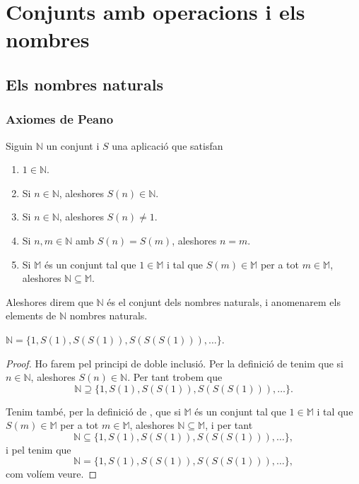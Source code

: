 \documentclass[../Apunts.tex]{subfiles}
\begin{document}
	\chapter{Conjunts amb operacions i els nombres}
	\section{Els nombres naturals}
	\subsection{Axiomes de Peano}
	\begin{definition}
		\label{def:nombres naturals}
		Siguin \(\mathbb{N}\) un conjunt i \(S\) una aplicació que satisfan
		\begin{enumerate}
			\item \(1\in\mathbb{N}\).
			\item Si \(n\in\mathbb{N}\), aleshores \(S(n)\in\mathbb{N}\).
			\item Si \(n\in\mathbb{N}\), aleshores \(S(n)\neq1\).
			\item Si \(n,m\in\mathbb{N}\) amb \(S(n)=S(m)\), aleshores \(n=m\).
			\item Si \(\mathbb{M}\) és un conjunt tal que \(1\in\mathbb{M}\) i tal que \(S(m)\in\mathbb{M}\) per a tot \(m\in\mathbb{M}\), aleshores \(\mathbb{N}\subseteq\mathbb{M}\).
		\end{enumerate}
		Aleshores direm que \(\mathbb{N}\) és el conjunt dels nombres naturals, i anomenarem els elements de \(\mathbb{N}\) nombres naturals.
	\end{definition}
	\begin{lemma}
		\label{lema:primer element}
		\(\mathbb{N}=\{1,S(1),S(S(1)),S(S(S(1))),\dots\}\).
		\begin{proof}
			Ho farem pel principi de doble inclusió. Per la definició de  tenim que si \(n\in\mathbb{N}\), aleshores \(S(n)\in\mathbb{N}\). Per tant trobem que
			\[\mathbb{N}\supseteq\{1,S(1),S(S(1)),S(S(S(1))),\dots\}.\]
			
			Tenim també, per la definició de , que si \(\mathbb{M}\) és un conjunt tal que \(1\in\mathbb{M}\) i tal que \(S(m)\in\mathbb{M}\) per a tot \(m\in\mathbb{M}\), aleshores \(\mathbb{N}\subseteq\mathbb{M}\), i per tant
			\[\mathbb{N}\subseteq\{1,S(1),S(S(1)),S(S(S(1))),\dots\},\]
			i pel  tenim que
			\[\mathbb{N}=\{1,S(1),S(S(1)),S(S(S(1))),\dots\},\]
			com volíem veure.
		\end{proof}
	\end{lemma}
\end{document}
